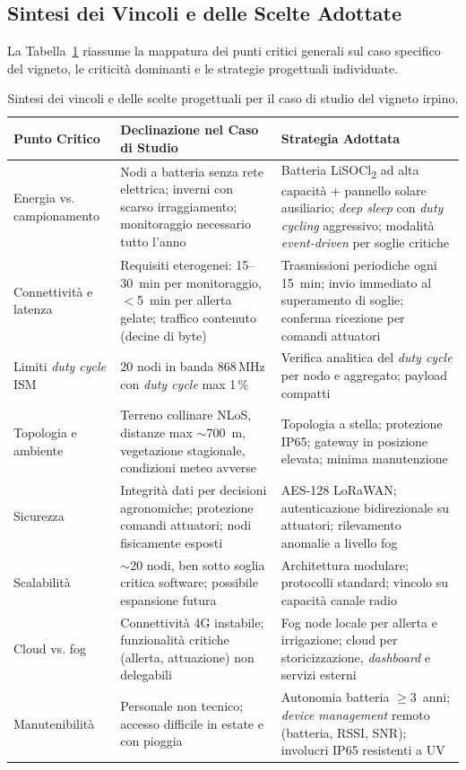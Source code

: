 \subsection{Sintesi dei Vincoli e delle Scelte Adottate}

La Tabella~\ref{tab:vincoli_vigneto} riassume la mappatura dei punti critici generali sul caso specifico del vigneto, le criticità dominanti e le strategie progettuali individuate.

\begin{table}[H]
	\centering
	\small
	\begin{tabularx}{\textwidth}{|l|X|X|}
		\hline
		\textbf{Punto Critico} & \textbf{Declinazione nel Caso di Studio} & \textbf{Strategia Adottata} \\
		\hline
		Energia vs. campionamento & Nodi a batteria senza rete elettrica; inverni con scarso irraggiamento; monitoraggio necessario tutto l'anno & Batteria LiSOCl\textsubscript{2} ad alta capacità + pannello solare ausiliario; \textit{deep sleep} con \textit{duty cycling} aggressivo; modalità \textit{event-driven} per soglie critiche \\
		\hline
		Connettività e latenza & Requisiti eterogenei: 15--30~min per monitoraggio, $<$5~min per allerta gelate; traffico contenuto (decine di byte) & Trasmissioni periodiche ogni 15~min; invio immediato al superamento di soglie; conferma ricezione per comandi attuatori \\
		\hline
		Limiti \textit{duty cycle} ISM & 20 nodi in banda 868\,MHz con \textit{duty cycle} max 1\,\%~\cite{etsi300220} & Verifica analitica del \textit{duty cycle} per nodo e aggregato; payload compatti \\
		\hline
		Topologia e ambiente & Terreno collinare NLoS, distanze max $\sim$700~m, vegetazione stagionale, condizioni meteo avverse & Topologia a stella; protezione IP65; gateway in posizione elevata; minima manutenzione \\
		\hline
		Sicurezza & Integrità dati per decisioni agronomiche; protezione comandi attuatori; nodi fisicamente esposti & AES-128 LoRaWAN; autenticazione bidirezionale su attuatori; rilevamento anomalie a livello fog \\
		\hline
		Scalabilità & $\sim$20 nodi, ben sotto soglia critica software; possibile espansione futura & Architettura modulare; protocolli standard; vincolo su capacità canale radio \\
		\hline
		Cloud vs. fog & Connettività 4G instabile; funzionalità critiche (allerta, attuazione) non delegabili & Fog node locale per allerta e irrigazione; cloud per storicizzazione, \textit{dashboard} e servizi esterni \\
		\hline
		Manutenibilità & Personale non tecnico; accesso difficile in estate e con pioggia & Autonomia batteria $\geq$3~anni; \textit{device management} remoto (batteria, RSSI, SNR); involucri IP65 resistenti a UV \\
		\hline
	\end{tabularx}
	\caption{Sintesi dei vincoli e delle scelte progettuali per il caso di studio del vigneto irpino.}
	\label{tab:vincoli_vigneto}
\end{table}

